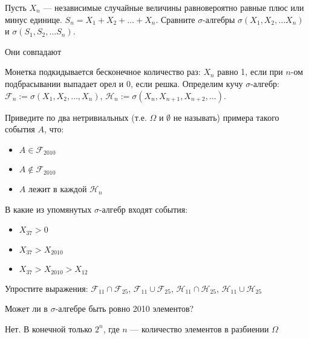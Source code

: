 \begin{problem}
Пусть $X_{n}$ --- независимые случайные величины равновероятно равные плюс или минус единице. $S_{n}=X_{1}+X_{2}+\ldots+X_{n}$. Сравните $\sigma$-алгебры $ \sigma(X_{1},X_{2},\ldots X_{n}) $ и $ \sigma(S_{1},S_{2},\ldots S_{n}) $.
\end{problem} 
\begin{solution} 
Они совпадают
\end{solution}

\begin{problem}
Монетка подкидывается бесконечное количество раз: $X_{n}$ равно 1, если при $ n $-ом подбрасывании выпадает орел и 0, если решка. Определим кучу $ \sigma $-алгебр: $\mathcal{F}_{n}:=\sigma(X_{1},X_{2},\ldots,X_{n})$, $\mathcal{H}_{n}:=\sigma(X_{n},X_{n+1},X_{n+2},\ldots)$.

Приведите по два нетривиальных (т.е. $ \Omega $ и $ \emptyset $ не называть) примера такого события $ A $, что:

\begin{itemize}
\item $ A\in \mathcal{F}_{2010} $
\item $ A\notin \mathcal{F}_{2010} $
\item $A$ лежит в каждой $\mathcal{H}_{n}$
\end{itemize}

В какие из упомянутых $ \sigma $-алгебр входят события:
\begin{itemize}
\item $ X_{37}>0$
\item $ X_{37}>X_{2010}$
\item $ X_{37}>X_{2010}>X_{12}$
\end{itemize}

Упростите выражения: $ \mathcal{F}_{11}\cap \mathcal{F}_{25} $, $ \mathcal{F}_{11}\cup \mathcal{F}_{25} $, $ \mathcal{H}_{11}\cap \mathcal{H}_{25} $, $ \mathcal{H}_{11}\cup \mathcal{H}_{25} $
\end{problem} 
\begin{solution} 

\end{solution}

\begin{problem}
Может ли в $ \sigma $-алгебре быть ровно 2010 элементов?
\end{problem} 
\begin{solution} 
Нет. В конечной только $ 2^{n} $, где $ n $ --- количество элементов в разбиении $ \Omega $
\end{solution}

